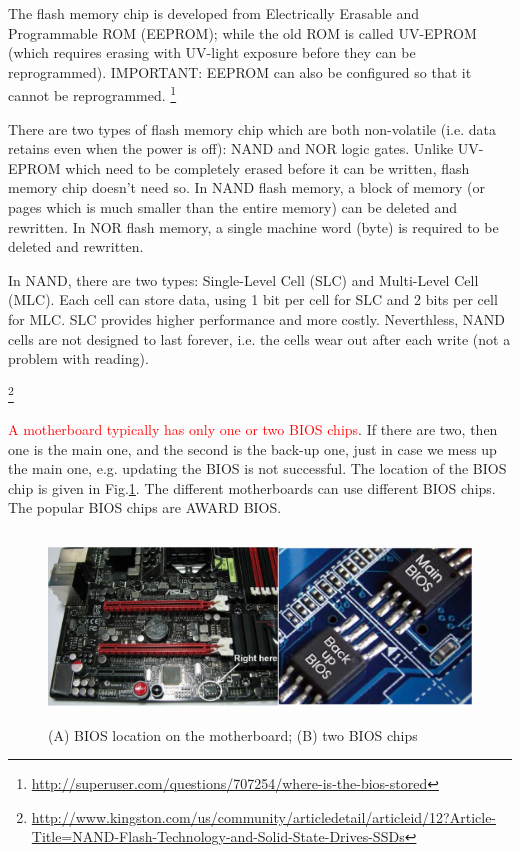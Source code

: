 The flash memory chip is developed from  Electrically Erasable and Programmable ROM
(EEPROM); while the old ROM is called UV-EPROM (which requires erasing with
UV-light exposure before they can be reprogrammed). IMPORTANT:
EEPROM can also be configured so that it cannot be reprogrammed.
\footnote{\url{http://superuser.com/questions/707254/where-is-the-bios-stored}}

\begin{mdframed}

There are two types of flash memory chip which are both non-volatile (i.e. data
retains even when the power is off):
NAND and NOR logic gates.
Unlike UV-EPROM which need to be completely erased before it can be written,
flash memory chip doesn't need so. In NAND flash memory, a block of memory (or
pages which is much smaller than the entire memory) can be deleted and
rewritten. In NOR flash memory, a single machine word (byte) is required to be
deleted and rewritten.

In NAND, there are two types:  Single-Level Cell (SLC) and Multi-Level Cell
(MLC). Each cell can store data, using 1 bit per cell for SLC and 2 bits per
cell for MLC. SLC provides higher performance and more costly. Neverthless, NAND
cells are not designed to last forever, i.e. the cells wear out after each
write (not a problem with reading).

\footnote{\url{http://www.kingston.com/us/community/articledetail/articleid/12?Article-Title=NAND-Flash-Technology-and-Solid-State-Drives-SSDs}}
\end{mdframed}
\vspace{0.2cm}


\textcolor{red}{A motherboard typically has only one or two BIOS chips}. If
there are two, then one is the main one, and the second is the back-up one, just
in case we mess up the main one, e.g. updating the BIOS is not successful. The
location of the BIOS chip is given in Fig.\ref{fig:BIOS_location}. The different
motherboards can use different BIOS chips. The popular BIOS chips are AWARD
BIOS.




\begin{figure}[hbt]
  \centerline{\includegraphics[height=5cm,
    angle=0]{./images/BIOS_location.eps}}
  \caption{(A) BIOS location on the motherboard; (B) two BIOS chips}
  \label{fig:BIOS_location}
\end{figure}



